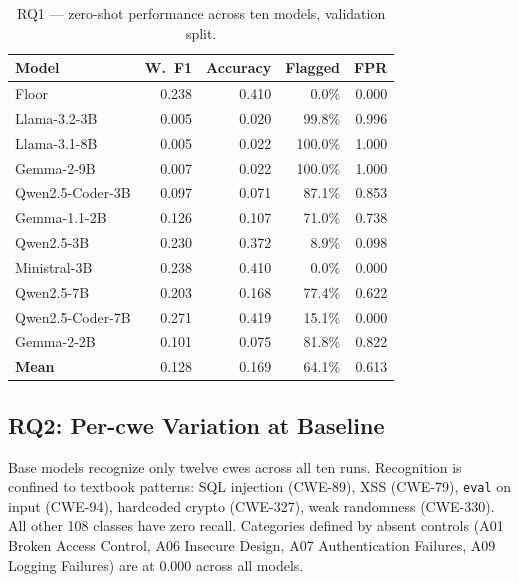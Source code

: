 \begin{table}[H]
\centering
\caption{RQ1 --- zero-shot performance across ten models, validation split.}
\label{tab:rq1}
\footnotesize
\begin{tabular}{l r r r r}
\toprule
\textbf{Model} & \textbf{W.\ F1} & \textbf{Accuracy} & \textbf{Flagged} & \textbf{FPR} \\
\midrule
Floor & 0.238 & 0.410 & 0.0\% & 0.000 \\
Llama-3.2-3B & 0.005 & 0.020 & 99.8\% & 0.996 \\
Llama-3.1-8B & 0.005 & 0.022 & 100.0\% & 1.000 \\
Gemma-2-9B & 0.007 & 0.022 & 100.0\% & 1.000 \\
Qwen2.5-Coder-3B & 0.097 & 0.071 & 87.1\% & 0.853 \\
Gemma-1.1-2B & 0.126 & 0.107 & 71.0\% & 0.738 \\
Qwen2.5-3B & 0.230 & 0.372 & 8.9\% & 0.098 \\
Ministral-3B & 0.238 & 0.410 & 0.0\% & 0.000 \\
Qwen2.5-7B & 0.203 & 0.168 & 77.4\% & 0.622 \\
Qwen2.5-Coder-7B & 0.271 & 0.419 & 15.1\% & 0.000 \\
Gemma-2-2B & 0.101 & 0.075 & 81.8\% & 0.822 \\
\midrule
\textbf{Mean} & 0.128 & 0.169 & 64.1\% & 0.613 \\
\bottomrule
\end{tabular}
\end{table}

\subsection{RQ2: Per-\gls{cwe} Variation at Baseline}

Base models recognize only twelve \glspl{cwe} across all ten runs. Recognition is confined to textbook patterns: SQL injection (CWE-89), XSS (CWE-79), \texttt{eval} on input (CWE-94), hardcoded crypto (CWE-327), weak randomness (CWE-330). All other 108 classes have zero recall. Categories defined by absent controls (A01 Broken Access Control, A06 Insecure Design, A07 Authentication Failures, A09 Logging Failures) are at 0.000 across all models.

